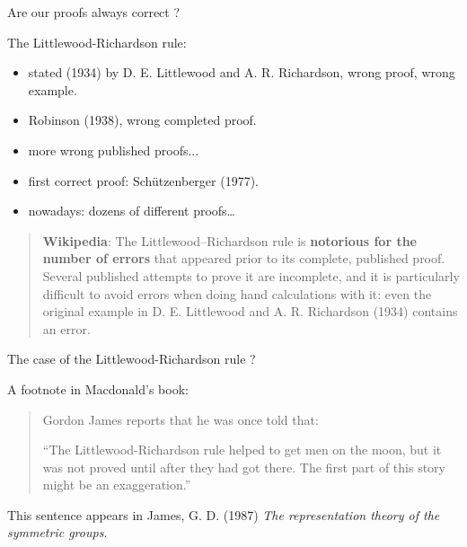 \documentclass[compress,11pt]{beamer}
\newcommand{\red}[1]{{\color{red} #1}}
\newcommand{\grn}[1]{{\color{green} #1}}
\begin{document}
\begin{frame}{Are our proofs always correct ?}

  The Littlewood-Richardson rule:

  \begin{itemize}
  \item stated (1934) by D. E. Littlewood and A. R. Richardson, \red{wrong
      proof, wrong example}.
  \item Robinson (1938), wrong completed proof.
  \item more wrong published proofs...
  \item first correct proof: Schützenberger (1977).
  \item nowadays: dozens of different proofs\dots
  \end{itemize}

  \begin{quotation}\small
    \textbf{Wikipedia}: The Littlewood–Richardson rule is \textbf{notorious
      for the number of errors} that appeared prior to its complete, published
    proof. Several published attempts to prove it are incomplete, and it is
    particularly difficult to avoid errors when doing hand calculations with
    it: even the original example in D. E. Littlewood and A. R. Richardson
    (1934) contains an error.
 \end{quotation}
\end{frame}


\begin{frame}{The case of the Littlewood-Richardson rule ?}

  A footnote in Macdonald's book:
  \medskip

  \begin{quotation}
    \noindent
    Gordon James reports that he was once told that:

    ``The Littlewood-Richardson rule helped to \grn{get men on the
      moon}, but it was \red{not proved until after they had got
      there}. The first part of this story might be an exaggeration.''
  \end{quotation}
  \bigskip

  This sentence appears in James, G. D. (1987) \emph{The representation theory
    of the symmetric groups}.
\end{frame}
\end{document}
